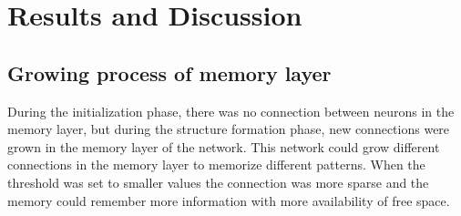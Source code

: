 \chapter{Results and Discussion}

\section{Growing process of memory layer}
During the initialization phase, there was no connection between neurons in the
memory layer, but during the structure formation phase, new connections were
grown in the memory layer of the network. This network could grow different
connections in the memory layer to memorize different patterns. When the
threshold was set to smaller values the connection was more sparse and the
memory could remember more information with more availability of free space.
